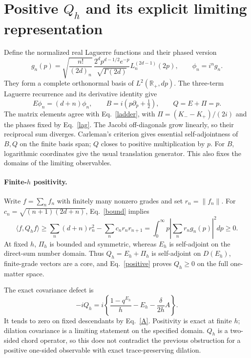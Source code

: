 \documentclass[11pt,a4paper]{article}
\newcommand{\norm}[1]{\lVert#1\rVert}
\begin{document}
\newpage
\section{Positive $Q_h$ and its explicit limiting representation}
Define the normalized real Laguerre functions and their phased version
\begin{equation}
 g_n(p)=\sqrt{\frac{n!}{(2d)_n}}\,
 \frac{2^d p^{d-1/2}e^{-p}}{\sqrt{\Gamma(2d)}}
 L_n^{(2d-1)}(2p),\qquad \phi_n=i^n g_n.\label{lag}
\end{equation}
They form a complete orthonormal basis of $L^2(\mathbb R_+,dp)$.
The three-term Laguerre recurrence and its derivative identity give
\begin{equation}
 E\phi_n=(d+n)\phi_n,\qquad
 B=i(p\partial_p+\tfrac12),\qquad Q=E+\Pi=p.\label{rep}
\end{equation}
The matrix elements agree with Eq.~\eqref{ladder}, with
$\Pi=(K_--K_+)/(2i)$ and the phases fixed by Eq.~\eqref{lag}.
The Jacobi off-diagonals grow linearly, so their reciprocal sum
diverges. Carleman's criterion gives essential self-adjointness of
$B,Q$ on the finite basis span; $Q$ closes to positive multiplication
by $p$. For $B$, logarithmic coordinates give the usual translation
generator. This also fixes the domains of the limiting observables.

\paragraph{Finite-$h$ positivity.}
Write $f=\sum_n f_n$ with finitely many nonzero grades and set
$r_n=\norm{f_n}$. For $c_n=\sqrt{(n+1)(2d+n)}$,
Eq.~\eqref{bound} implies
\begin{equation}
 \langle f,Q_h f\rangle\ge
 \sum_n(d+n)r_n^2-\sum_n c_n r_n r_{n+1}
 =\int_0^\infty p\left|\sum_n r_n g_n(p)\right|^2dp\ge0.\label{positive}
\end{equation}
At fixed $h$, $\Pi_h$ is bounded and symmetric, whereas $E_h$ is
self-adjoint on the direct-sum number domain. Thus $Q_h=E_h+\Pi_h$
is self-adjoint on $D(E_h)$, finite-grade vectors are a core, and
Eq.~\eqref{positive} proves $Q_h\ge0$ on the full one-matter space.

The exact covariance defect is
\begin{equation}
 [B_h,Q_h]-iQ_h=i\left\{\frac{1-q^{E_h}}h-E_h
                         -\frac{\delta}{2h}A\right\}.\label{defect}
\end{equation}
It tends to zero on fixed descendants by Eq.~\eqref{A}. Positivity is
exact at finite $h$; dilation covariance is a limiting statement on
the specified domain. $Q_h$ is a two-sided chord operator, so this
does not contradict the previous obstruction for a positive
one-sided observable with exact trace-preserving dilation.
\end{document}
